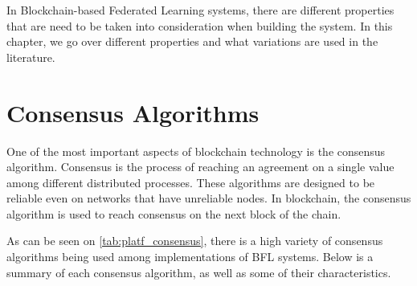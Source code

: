 In Blockchain-based Federated Learning systems, there are different properties that are need to be taken into consideration when building the system. In this chapter, we go over different properties and what variations are used in the literature.

\section{Consensus Algorithms}\label{related_work:consensus_algorithms}

One of the most important aspects of blockchain technology is the consensus algorithm. Consensus is the process of reaching an agreement on a single value among different distributed processes. These algorithms are designed to be reliable even on networks that have unreliable nodes. In blockchain, the consensus algorithm is used to reach consensus on the next block of the chain.

As can be seen on \autoref{tab:platf_consensus}, there is a high variety of consensus algorithms being used among implementations of BFL systems. Below is a summary of each consensus algorithm, as well as some of their characteristics.

